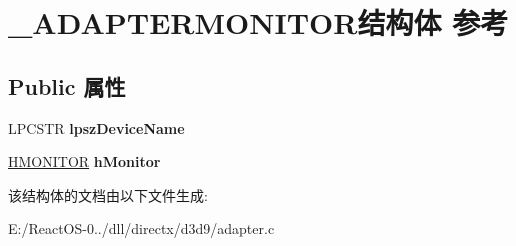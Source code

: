 \hypertarget{struct___a_d_a_p_t_e_r_m_o_n_i_t_o_r}{}\section{\+\_\+\+A\+D\+A\+P\+T\+E\+R\+M\+O\+N\+I\+T\+O\+R结构体 参考}
\label{struct___a_d_a_p_t_e_r_m_o_n_i_t_o_r}
\subsection*{Public 属性}
\begin{DoxyCompactItemize}
\item 
\mbox{\label{struct___a_d_a_p_t_e_r_m_o_n_i_t_o_r_ace975832eabc1e2c2f07dcda34ecf507}} 
L\+P\+C\+S\+TR {\bfseries lpsz\+Device\+Name}
\item 
\mbox{\label{struct___a_d_a_p_t_e_r_m_o_n_i_t_o_r_a26bd68ab15274578e83ae43222a0901d}} 
\hyperlink{interfacevoid}{H\+M\+O\+N\+I\+T\+OR} {\bfseries h\+Monitor}
\end{DoxyCompactItemize}


该结构体的文档由以下文件生成\+:\begin{DoxyCompactItemize}
\item 
E\+:/\+React\+O\+S-\/0../dll/directx/d3d9/adapter.\+c\end{DoxyCompactItemize}
